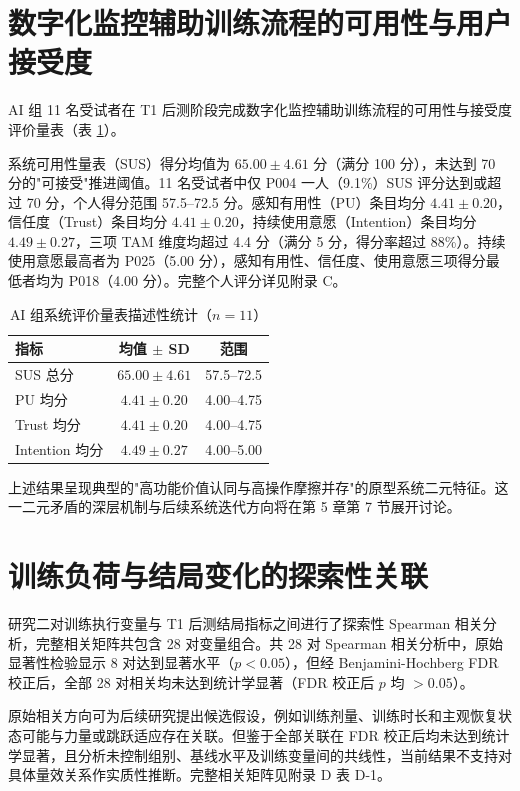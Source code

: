 \documentclass[UTF8,zihao=-4,twoside,openany]{ctexbook}
\begin{document}
\section{数字化监控辅助训练流程的可用性与用户接受度}
AI 组 11 名受试者在 T1 后测阶段完成数字化监控辅助训练流程的可用性与接受度评价量表（表 \ref{tab:ch4-tam}）。

系统可用性量表（SUS）得分均值为 $65.00 \pm 4.61$ 分（满分 100 分），未达到 70 分的"可接受"推进阈值。11 名受试者中仅 P004 一人（9.1\%）SUS 评分达到或超过 70 分，个人得分范围 57.5--72.5 分。感知有用性（PU）条目均分 $4.41 \pm 0.20$，信任度（Trust）条目均分 $4.41 \pm 0.20$，持续使用意愿（Intention）条目均分 $4.49 \pm 0.27$，三项 TAM 维度均超过 4.4 分（满分 5 分，得分率超过 88\%）。持续使用意愿最高者为 P025（5.00 分），感知有用性、信任度、使用意愿三项得分最低者均为 P018（4.00 分）。完整个人评分详见附录 C。

\begin{table}[htbp]
  \centering
  \caption{AI 组系统评价量表描述性统计（$n=11$）}
  \label{tab:ch4-tam}
  \vspace{6pt}
  \small
  \begin{tabularx}{\textwidth}{lcc}
    \toprule
    \textbf{指标} & \textbf{均值 $\pm$ SD} & \textbf{范围} \\
    \midrule
    SUS 总分 & $65.00 \pm 4.61$ & 57.5--72.5 \\
    PU 均分 & $4.41 \pm 0.20$ & 4.00--4.75 \\
    Trust 均分 & $4.41 \pm 0.20$ & 4.00--4.75 \\
    Intention 均分 & $4.49 \pm 0.27$ & 4.00--5.00 \\
    \bottomrule
  \end{tabularx}
\end{table}

上述结果呈现典型的"高功能价值认同与高操作摩擦并存"的原型系统二元特征。这一二元矛盾的深层机制与后续系统迭代方向将在第 5 章第 7 节展开讨论。

\section{训练负荷与结局变化的探索性关联}
研究二对训练执行变量与 T1 后测结局指标之间进行了探索性 Spearman 相关分析，完整相关矩阵共包含 28 对变量组合。共 28 对 Spearman 相关分析中，原始显著性检验显示 8 对达到显著水平（$p < 0.05$），但经 Benjamini-Hochberg FDR 校正后，全部 28 对相关均未达到统计学显著（FDR 校正后 $p$ 均 $>0.05$）。

原始相关方向可为后续研究提出候选假设，例如训练剂量、训练时长和主观恢复状态可能与力量或跳跃适应存在关联。但鉴于全部关联在 FDR 校正后均未达到统计学显著，且分析未控制组别、基线水平及训练变量间的共线性，当前结果不支持对具体量效关系作实质性推断。完整相关矩阵见附录 D 表 D-1。
\end{document}
